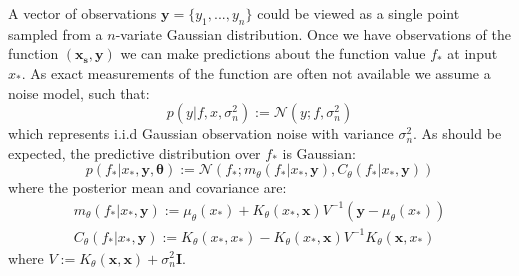 \documentclass{article}
\newcommand{\vect}[1]{\mathbf{#1}}
\newcommand{\xd}{\vect{x}}
\newcommand{\yd}{\vect{y}}
\begin{document}
A vector of observations $\mathbf{y} = \{ y_1,...,y_n\}$ could be viewed as a single point sampled from a $n$-variate Gaussian distribution. Once we have observations of the function $(\mathbf{x_s},\yd)$ we can make predictions about the function value $f_*$ at input $x_*$. As exact measurements of the function are often not available we assume a noise model, such that:
\begin{equation}\label{obsnoise}
p(y | f, x, \sigma_n^2) := \mathcal{N}(y; f, \sigma_n^2)
\end{equation} 
which represents i.i.d Gaussian observation noise with variance $\sigma_n^2$. As should be expected, the predictive distribution over $f_*$ is Gaussian:
\begin{equation}\label{posteriorpred}
p(f_* | x_*, \yd,\bm{\theta}) := \mathcal{N} ( f_* ; m_\theta(f_* | x_*, \yd), C_\theta(f_* | x_*, \yd))
\end{equation}
where the posterior mean and covariance are:
\begin{align}
m_\theta(f_* | x_*, \yd) := \mu_\theta(x_*) + K_\theta(x_*,\xd)V^{-1}(\yd - \mu_\theta(x_*))\\
C_\theta(f_* | x_*, \yd) := K_\theta(x_*,x_*) - K_\theta(x_*,\xd)V^{-1}K_\theta(\xd,x_*)
\end{align}
where $V := K_\theta(\xd,\xd) + \sigma_n^2\mathbf{I}$.
\end{document}
